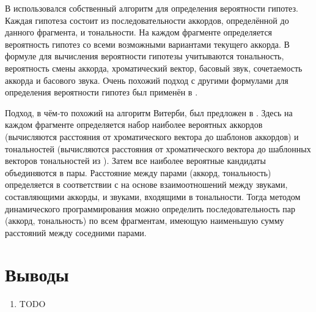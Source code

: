 В \cite{Yoshioka2004} использовался собственный алгоритм для определения
вероятности гипотез. Каждая гипотеза состоит из последовательности аккордов,
определённой до данного фрагмента, и тональности. На каждом фрагменте
определяется вероятность гипотез со всеми возможными вариантами текущего
аккорда. В формуле для вычисления вероятности гипотезы учитываются тональность,
вероятность смены аккорда, хроматический вектор, басовый звук, сочетаемость
аккорда и басового звука. Очень похожий подход с другими формулами для
определения вероятности гипотез был применён в \cite{Sumi2008}.

Подход, в чём-то похожий на алгоритм Витерби, был предложен в \cite{Rocher2010}.
Здесь на каждом фрагменте определяется набор наиболее вероятных аккордов
(вычисляются расстояния от хроматического вектора до шаблонов аккордов) и
тональностей (вычисляются расстояния от хроматического вектора до шаблонных
векторов тональностей из \cite{Temperley2001}). Затем все наиболее вероятные
кандидаты объединяются в пары. Расстояние между парами (аккорд, тональность)
определяется в соответствии с \cite{Lerdahl2001} на основе взаимоотношений
между звуками, составляющими аккорды, и звуками, входящими в тональности. Тогда
методом динамического программирования можно определить последовательность пар
(аккорд, тональность) по всем фрагментам, имеющую наименьшую сумму расстояний
между соседними парами.

% 

\section{Выводы}

\begin{enumerate}
  \item TODO
\end{enumerate}

\clearpage
